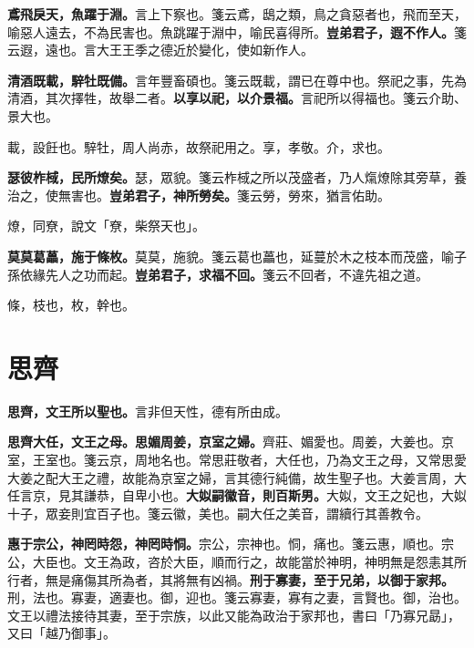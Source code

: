 \textbf{鳶飛戾天，魚躍于淵。}{\footnotesize 言上下察也。箋云鳶，鴟之類，鳥之貪惡者也，飛而至天，喻惡人遠去，不為民害也。魚跳躍于淵中，喻民喜得所。}\textbf{豈弟君子，遐不作人。}{\footnotesize 箋云遐，遠也。言大王王季之德近於變化，使如新作人。}

\textbf{清酒既載，騂牡既備。}{\footnotesize 言年豐畜碩也。箋云既載，謂已在尊中也。祭祀之事，先為清酒，其次擇牲，故舉二者。}\textbf{以享以祀，以介景福。}{\footnotesize 言祀所以得福也。箋云介助、景大也。}

\begin{quoting}載，設飪也。騂牡，周人尚赤，故祭祀用之。享，孝敬。介，求也。\end{quoting}

\textbf{瑟彼柞棫，民所燎矣。}{\footnotesize 瑟，眾貌。箋云柞棫之所以茂盛者，乃人熂燎除其旁草，養治之，使無害也。}\textbf{豈弟君子，神所勞矣。}{\footnotesize 箋云勞，勞來，猶言佑助。}

\begin{quoting}燎，同尞，說文「尞，柴祭天也」。\end{quoting}

\textbf{莫莫葛藟，施于條枚。}{\footnotesize 莫莫，施貌。箋云葛也藟也，延蔓於木之枝本而茂盛，喻子孫依緣先人之功而起。}\textbf{豈弟君子，求福不回。}{\footnotesize 箋云不回者，不違先祖之道。}

\begin{quoting}條，枝也，枚，幹也。\end{quoting}

\section{思齊}


\textbf{思齊，文王所以聖也。}{\footnotesize 言非但天性，德有所由成。}

\textbf{思齊大任，文王之母。思媚周姜，京室之婦。}{\footnotesize 齊莊、媚愛也。周姜，大姜也。京室，王室也。箋云京，周地名也。常思莊敬者，大任也，乃為文王之母，又常思愛大姜之配大王之禮，故能為京室之婦，言其德行純備，故生聖子也。大姜言周，大任言京，見其謙恭，自卑小也。}\textbf{大姒嗣徽音，則百斯男。}{\footnotesize 大姒，文王之妃也，大姒十子，眾妾則宜百子也。箋云徽，美也。嗣大任之美音，謂續行其善教令。}

\textbf{惠于宗公，神罔時怨，神罔時恫。}{\footnotesize 宗公，宗神也。恫，痛也。箋云惠，順也。宗公，大臣也。文王為政，咨於大臣，順而行之，故能當於神明，神明無是怨恚其所行者，無是痛傷其所為者，其將無有凶禍。}\textbf{刑于寡妻，至于兄弟，以御于家邦。}{\footnotesize 刑，法也。寡妻，適妻也。御，迎也。箋云寡妻，寡有之妻，言賢也。御，治也。文王以禮法接待其妻，至于宗族，以此又能為政治于家邦也，書曰「乃寡兄勗」，又曰「越乃御事」。}

